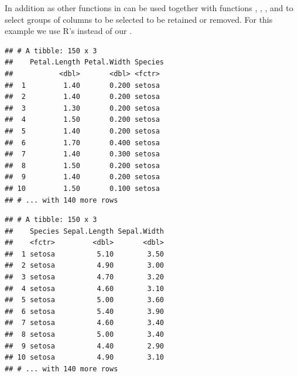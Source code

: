 \documentclass[krantz2,ChapterTOCs]{krantz}\usepackage{knitr}
\begin{document}
In addition  as other functions in  can be used together with functions , , , and  to select groups of columns to be selected to be retained or removed. For this example we use R's  instead of our .

\begin{knitrout}\footnotesize
{}\color{fgcolor}\begin{kframe}
\begin{alltt}
 \hlopt{-}\hlstd{(}\hlstd{))}
\end{alltt}
\begin{verbatim}
## # A tibble: 150 x 3
##    Petal.Length Petal.Width Species
##           <dbl>       <dbl> <fctr> 
##  1         1.40       0.200 setosa 
##  2         1.40       0.200 setosa 
##  3         1.30       0.200 setosa 
##  4         1.50       0.200 setosa 
##  5         1.40       0.200 setosa 
##  6         1.70       0.400 setosa 
##  7         1.40       0.300 setosa 
##  8         1.50       0.200 setosa 
##  9         1.40       0.200 setosa 
## 10         1.50       0.100 setosa 
## # ... with 140 more rows
\end{verbatim}
\end{kframe}
\end{knitrout}

\begin{knitrout}\footnotesize
{}\color{fgcolor}\begin{kframe}
\begin{alltt}
 \hlstd{(}\hlstd{))}
\end{alltt}
\begin{verbatim}
## # A tibble: 150 x 3
##    Species Sepal.Length Sepal.Width
##    <fctr>         <dbl>       <dbl>
##  1 setosa          5.10        3.50
##  2 setosa          4.90        3.00
##  3 setosa          4.70        3.20
##  4 setosa          4.60        3.10
##  5 setosa          5.00        3.60
##  6 setosa          5.40        3.90
##  7 setosa          4.60        3.40
##  8 setosa          5.00        3.40
##  9 setosa          4.40        2.90
## 10 setosa          4.90        3.10
## # ... with 140 more rows
\end{verbatim}
\end{kframe}
\end{knitrout}
\end{document}
